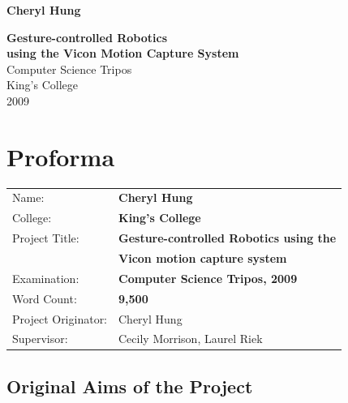 \documentclass[12pt,a4,notitlepage]{report}
\renewcommand{\_}{\texttt{\symbol{95}}}
\newcommand{\<}{\texttt{\symbol{60}}}
\renewcommand{\>}{\texttt{\symbol{62}}}
\begin{document}



\pagestyle{empty}

\hfill{\LARGE \bf Cheryl Hung}

\vspace*{30mm}
\begin{center}
\Huge
{\bf Gesture-controlled Robotics \\
using the Vicon Motion Capture System} \\
\vspace*{25mm}
Computer Science Tripos \\
\vspace*{5mm}
King's College \\
\vspace*{5mm}
2009
\end{center}

\cleardoublepage


\setcounter{page}{1}
\pagestyle{plain}

\chapter*{Proforma}

{\large
\begin{tabular}{ll}
Name:               & \bf Cheryl Hung                       \\
College:            & \bf King's College                     \\
Project Title:      & \bf Gesture-controlled Robotics using the \\
                    & \bf Vicon motion capture system \\
Examination:        & \bf Computer Science Tripos, 2009        \\
Word Count:         & \bf 9,500 \\
Project Originator: & Cheryl Hung                    \\
Supervisor:         & Cecily Morrison, Laurel Riek                    \\ 
\end{tabular}
}

\section*{Original Aims of the Project}
\end{document}
